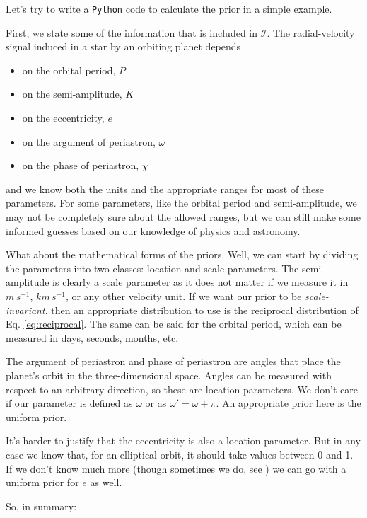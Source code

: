 \documentclass[a4paper,11pt]{article}
\begin{document}
  Let's try to write a \texttt{Python} code to calculate the prior in a simple example.

  First, we state some of the information that is included in $\mathcal{I}$.
  The radial-velocity signal induced in a star by an orbiting planet depends

  \begin{itemize}
    \item on the orbital period, $P$
    \item on the semi-amplitude, $K$
    \item on the eccentricity, $e$
    \item on the argument of periastron, $\omega$
    \item on the phase of periastron, $\chi$
  \end{itemize}

  and we know both the units and the appropriate ranges for most of these parameters.
  For some parameters, like the orbital period and semi-amplitude, we may not be completely sure about the allowed ranges, 
  but we can still make some informed guesses based on our knowledge of physics and astronomy.

  What about the mathematical forms of the priors. Well, we can start by dividing the parameters into two classes: location and scale parameters.
  The semi-amplitude is clearly a scale parameter as it does not matter if we measure it in $m\,s^{-1}$, $km\,s^{-1}$, or any other velocity unit. 
  If we want our prior to be \emph{scale-invariant}, then an appropriate distribution to use is the reciprocal distribution of Eq. \eqref{eq:reciprocal}.
  The same can be said for the orbital period, which can be measured in days, seconds, months, etc.

  The argument of periastron and phase of periastron are angles that place the planet's orbit in the three-dimensional space.
  Angles can be measured with respect to an arbitrary direction, so these are location parameters. 
  We don't care if our parameter is defined as $\omega$ or as $\omega'=\omega+\pi$.
  An appropriate prior here is the uniform prior. 

  It's harder to justify that the eccentricity is also a location parameter.
  But in any case we know that, for an elliptical orbit, it should take values between 0 and 1.
  If we don't know much more (though sometimes we do, see \cite{Kipping2013}) we can go with a uniform prior for $e$ as well.

  So, in summary:
\end{document}
